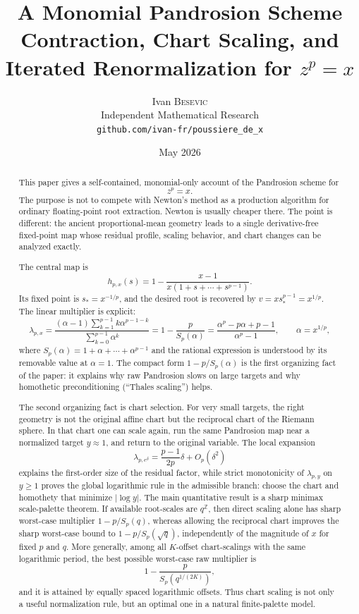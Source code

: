 \documentclass[10pt,a4paper]{article}
\title{\bfseries A Monomial Pandrosion Scheme\\[-0.1em]
\large Contraction, Chart Scaling, and Iterated Renormalization for $z^p=x$}
\author{Ivan \textsc{Besevic}\\[-0.2em]
\small Independent Mathematical Research\\[-0.2em]
\small \texttt{github.com/ivan-fr/poussiere\_de\_x}}
\date{May 2026}
\theoremstyle{plain}
\theoremstyle{definition}
\theoremstyle{remark}
\begin{document}
\maketitle

\begin{abstract}
This paper gives a self-contained, monomial-only account of the Pandrosion
scheme for
\[
  z^p=x.
\]
The purpose is not to compete with Newton's method as a production algorithm
for ordinary floating-point root extraction.  Newton is usually cheaper there.
The point is different: the ancient proportional-mean geometry leads to a
single derivative-free fixed-point map whose residual profile, scaling behavior,
and chart changes can be analyzed exactly.

The central map is
\[
  h_{p,x}(s)=1-\frac{x-1}{x(1+s+\cdots+s^{p-1})}.
\]
Its fixed point is $s_*=x^{-1/p}$, and the desired root is recovered by
$v=x s_*^{p-1}=x^{1/p}$.  The linear multiplier is explicit:
\[
  \lambda_{p,x}
  =\frac{(\alpha-1)\sum_{k=1}^{p-1}k\alpha^{p-1-k}}
         {\sum_{k=0}^{p-1}\alpha^k}
  =1-\frac{p}{S_p(\alpha)}
  =\frac{\alpha^p-p\alpha+p-1}{\alpha^p-1},
  \qquad \alpha=x^{1/p},
\]
where $S_p(\alpha)=1+\alpha+\cdots+\alpha^{p-1}$ and the rational expression is
understood by its removable value at $\alpha=1$.  The compact form
$1-p/S_p(\alpha)$ is the first organizing fact of the paper: it explains why
raw Pandrosion slows on large targets and why homothetic preconditioning
(``Thales scaling'') helps.

The second organizing fact is chart selection.  For very small targets, the
right geometry is not the original affine chart but the reciprocal chart of the
Riemann sphere.  In that chart one can scale again, run the same Pandrosion map
near a normalized target $y\approx1$, and return to the original variable.  The
local expansion
\[
  \lambda_{p,e^\delta}=\frac{p-1}{2p}\delta+O_p(\delta^2)
\]
explains the first-order size of the residual factor, while strict monotonicity
of $\lambda_{p,y}$ on $y\ge1$ proves the global logarithmic rule in the
admissible branch: choose the chart and homothety that minimize $|\log y|$.
The main quantitative result is a sharp minimax scale-palette theorem.  If
available root-scales are $q^{\mathbb Z}$, then direct scaling alone has sharp
worst-case multiplier $1-p/S_p(q)$, whereas allowing the reciprocal chart
improves the sharp worst-case bound to $1-p/S_p(\sqrt q)$, independently of
the magnitude of $x$ for fixed $p$ and $q$.  More generally, among all
$K$-offset chart-scalings with the same logarithmic period, the best possible
worst-case raw multiplier is
\[
  1-\frac{p}{S_p(q^{1/(2K)})},
\]
and it is attained by equally spaced logarithmic offsets.  Thus chart scaling is
not only a useful normalization rule, but an optimal one in a natural finite-palette
model.


\end{abstract}
\end{document}
